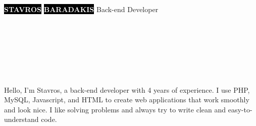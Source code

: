 \documentclass[10pt]{developercv}
\begin{document}
\begin{minipage}[t]{0.45\textwidth}
	\vspace{-\baselineskip}
	\colorbox{black}{{\HUGE\textcolor{white}{\textbf{\MakeUppercase{Stavros}}}}}
	\colorbox{black}{{\HUGE\textcolor{white}{\textbf{\MakeUppercase{Baradakis}}}}}
	\vspace{6pt}
	{\huge Back-end Developer}\\
\end{minipage}
\begin{minipage}[t]{0.275\textwidth}
	\vspace{-\baselineskip}
	\\
	\\
	\\	
\end{minipage}
\begin{minipage}[t]{0.345\textwidth}
	\vspace{-\baselineskip}
	\\
	\\
\end{minipage}
\vspace{0.5cm}

\begin{minipage}[t]{0.4\textwidth}
	\vspace{-\baselineskip}
	Hello, I'm Stavros, a back-end developer with 4 years of experience. I use PHP, MySQL, Javascript, and HTML to create web applications that work smoothly and look nice. I like solving problems and always try to write clean and easy-to-understand code.\\
\end{minipage}
\hfill
\begin{minipage}[t]{0.5\textwidth}
	\vspace{-\baselineskip}
	\begin{barchart}{5.5}
	\end{barchart}
\end{minipage}
\end{document}
